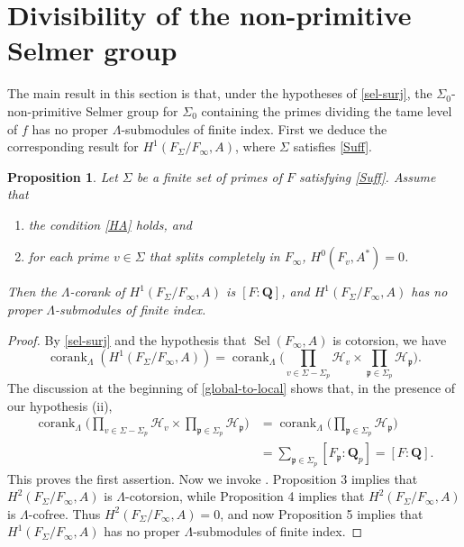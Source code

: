\documentclass[12 pt]{amsart}
\theoremstyle{plain}
\newtheorem{prop}[thm]{Proposition}
\theoremstyle{definition}
\numberwithin{equation}{section}
\numberwithin{table}{section}
\begin{document}
\section{Divisibility of the non-primitive Selmer group}
\label{nice-selmer}
\indent The main result in this section is that, under the hypotheses of \cref{sel-surj}, the $\Sigma_0$-non-primitive Selmer group for $\Sigma_0$ containing the primes dividing the tame level of $f$ has no proper $\Lambda$-submodules of finite index. First we deduce the corresponding result for $H^1(F_\Sigma/F_\infty,A)$, where $\Sigma$ satisfies \cref{Suff}.
\begin{prop}
\label{no-subs-global}
Let $\Sigma$ be a finite set of primes of $F$ satisfying \emph{\cref{Suff}}. Assume that
\begin{enumerate}
\item the condition \emph{\cref{HA}} holds, and
\item for each prime $v\in\Sigma$ that splits completely in $F_\infty$, $H^0(F_v,A^*)=0$.
\end{enumerate}
Then the $\Lambda$-corank of $H^1(F_\Sigma/F_\infty,A)$ is $[F:\mathbf{Q}]$, and $H^1(F_\Sigma/F_\infty,A)$ has no proper $\Lambda$-submodules of finite index.
\end{prop}
\begin{proof}
By \cref{sel-surj} and the hypothesis that $\operatorname{Sel}(F_\infty,A)$ is cotorsion, we have
\begin{equation*}
\operatorname{corank}_\Lambda(H^1(F_\Sigma/F_\infty,A))=\operatorname{corank}_\Lambda\Bigg(
\prod_{v\in\Sigma-\Sigma_p}\mathcal{H}_v\times\prod_{\mathfrak{p}\in\Sigma_p}\mathcal{H}_\mathfrak{p}\Bigg)\text{.}
\end{equation*}
The discussion at the beginning of \cref{global-to-local} shows that, in the presence of our hypothesis (ii),
\begin{align*}
\operatorname{corank}_\Lambda\Bigg(
\prod_{v\in\Sigma-\Sigma_p}\mathcal{H}_v\times\prod_{\mathfrak{p}\in\Sigma_p}\mathcal{H}_\mathfrak{p}\Bigg)&=
\operatorname{corank}_\Lambda\Bigg(\prod_{\mathfrak{p}\in\Sigma_p}\mathcal{H}_\mathfrak{p}\Bigg)\\
&=\sum_{\mathfrak{p}\in\Sigma_p}[F_\mathfrak{p}:\mathbf{Q}_p]=[F:\mathbf{Q}]\text{.}
\end{align*}
This proves the first assertion. Now we invoke \cite[Propositions 3-5]{GR89}. Proposition 3 implies that $H^2(F_\Sigma/F_\infty,A)$ is $\Lambda$-cotorsion, while Proposition 4 implies that $H^2(F_\Sigma/F_\infty,A)$ is $\Lambda$-cofree. Thus $H^2(F_\Sigma/F_\infty,A)=0$, and now Proposition 5 implies that $H^1(F_\Sigma/F_\infty,A)$ has no proper $\Lambda$-submodules of finite index.
\end{proof}
\end{document}
